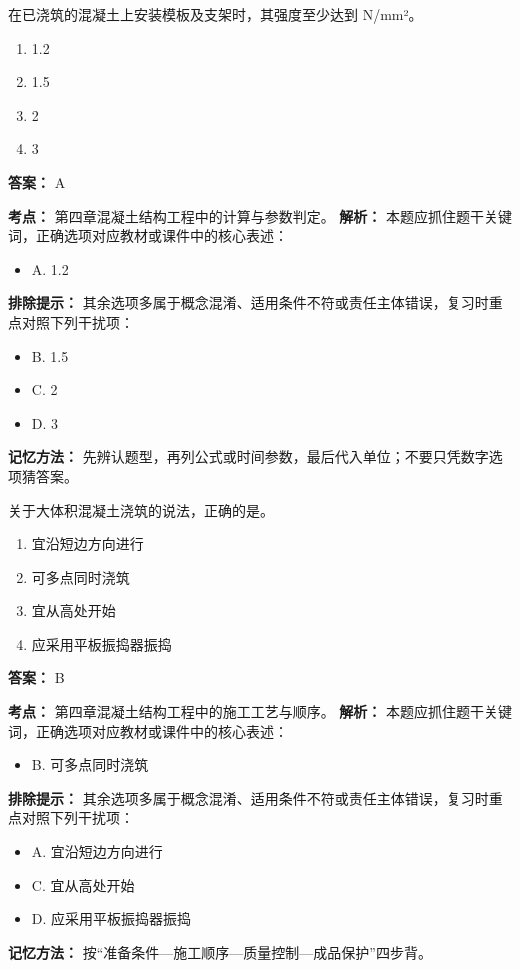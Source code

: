 \documentclass[UTF8,fontset=fandol,11pt]{ctexart}
\begin{document}
\begin{quizbox}[title={第 80 题}]
在已浇筑的混凝土上安装模板及支架时，其强度至少达到 N/mm²。\\
\begin{enumerate}[label=\Alph*.]
\item 1.2
\item 1.5
\item 2
\item 3
\end{enumerate}
\textbf{答案：} A
\vspace{0.25em}
\begin{answerbox}[title={考点解析}]
\textbf{考点：} 第四章混凝土结构工程中的计算与参数判定。
\textbf{解析：} 本题应抓住题干关键词，正确选项对应教材或课件中的核心表述：
\begin{itemize}
\item A. 1.2
\end{itemize}
\textbf{排除提示：} 其余选项多属于概念混淆、适用条件不符或责任主体错误，复习时重点对照下列干扰项：
\begin{itemize}
\item B. 1.5
\item C. 2
\item D. 3
\end{itemize}
\textbf{记忆方法：} 先辨认题型，再列公式或时间参数，最后代入单位；不要只凭数字选项猜答案。
\end{answerbox}
\end{quizbox}

\begin{quizbox}[title={第 81 题}]
关于大体积混凝土浇筑的说法，正确的是。\\
\begin{enumerate}[label=\Alph*.]
\item 宜沿短边方向进行
\item 可多点同时浇筑
\item 宜从高处开始
\item 应采用平板振捣器振捣
\end{enumerate}
\textbf{答案：} B
\vspace{0.25em}
\begin{answerbox}[title={考点解析}]
\textbf{考点：} 第四章混凝土结构工程中的施工工艺与顺序。
\textbf{解析：} 本题应抓住题干关键词，正确选项对应教材或课件中的核心表述：
\begin{itemize}
\item B. 可多点同时浇筑
\end{itemize}
\textbf{排除提示：} 其余选项多属于概念混淆、适用条件不符或责任主体错误，复习时重点对照下列干扰项：
\begin{itemize}
\item A. 宜沿短边方向进行
\item C. 宜从高处开始
\item D. 应采用平板振捣器振捣
\end{itemize}
\textbf{记忆方法：} 按“准备条件—施工顺序—质量控制—成品保护”四步背。
\end{answerbox}
\end{quizbox}
\end{document}
